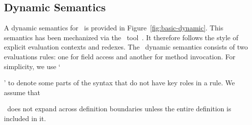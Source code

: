 %
%
%
%

\subsection{Dynamic Semantics}\label{basic-dynamic}
A dynamic semantics for \basiccore\ is provided in
Figure~\ref{fig:basic-dynamic}.
This semantics has been mechanized via the \pltredex\ tool~\cite{MFFF-RTA04}.
It therefore follows the style of explicit evaluation contexts and redexes.
The \basiccore\ dynamic semantics consists of two evaluations rules:
one for field access and another for method invocation.  
For simplicity, we use `\ignore' to denote some parts of the syntax
that do not have key roles in a rule.
We assume that \ignore\ does not expand across definition boundaries unless
the entire definition is included in it.

